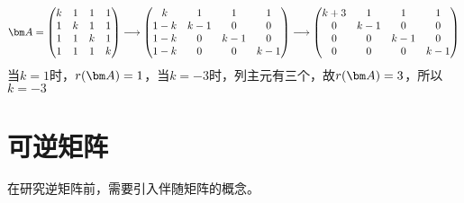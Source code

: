 \begin{solution}
    \[
        \mat{A} =
        \begin{pmatrix}
            k & 1 & 1 & 1 \\
            1 & k & 1 & 1 \\
            1 & 1 & k & 1 \\
            1 & 1 & 1 & k
        \end{pmatrix}
        \longrightarrow
        \begin{pmatrix}
            k   & 1   & 1   & 1   \\
            1-k & k-1 & 0   & 0   \\
            1-k & 0   & k-1 & 0   \\
            1-k & 0   & 0   & k-1
        \end{pmatrix}
        \longrightarrow
        \begin{pmatrix}
            k+3 & 1   & 1   & 1   \\
            0   & k-1 & 0   & 0   \\
            0   & 0   & k-1 & 0   \\
            0   & 0   & 0   & k-1
        \end{pmatrix}
    \]
    当$k=1$时，$r(\mat{A})=1$，当$k=-3$时，列主元有三个，故$r(\mat{A})=3$，所以$k=-3$
\end{solution}

\section{可逆矩阵}
在研究逆矩阵前，需要引入伴随矩阵的概念。
